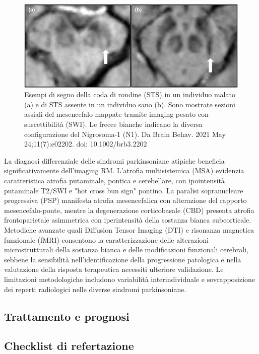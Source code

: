 \begin{figure}[h]
	\centering
	\includegraphics[width=0.8\linewidth]{FileAusiliari/Immagini/degenerative/BRB3-11-e02202-g002}
	\caption{Esempi di segno della coda di rondine (STS) in un individuo malato (a) e di STS assente in un individuo sano (b). Sono mostrate sezioni assiali del mesencefalo mappate tramite imaging pesato con suscettibilità (SWI). Le frecce bianche indicano la diversa configurazione del Nigrosoma-1 (N1). Da Brain Behav. 2021 May 24;11(7):e02202. doi: 10.1002/brb3.2202}
	\label{fig:brb3-11-e02202-g002}
\end{figure}


La diagnosi differenziale delle sindromi parkinsoniane atipiche beneficia significativamente dell'imaging RM. L'atrofia multisistemica (MSA) evidenzia caratteristica atrofia putaminale, pontica e cerebellare, con ipointensità putaminale T2/SWI e "hot cross bun sign" pontino. La paralisi sopranucleare progressiva (PSP) manifesta atrofia mesencefalica con alterazione del rapporto mesencefalo-ponte, mentre la degenerazione corticobasale (CBD) presenta atrofia frontoparietale asimmetrica con iperintensità della sostanza bianca subcorticale.
Metodiche avanzate quali Diffusion Tensor Imaging (DTI) e risonanza magnetica funzionale (fMRI) consentono la caratterizzazione delle alterazioni microstrutturali della sostanza bianca e delle modificazioni funzionali cerebrali, sebbene la sensibilità nell'identificazione della progressione patologica e nella valutazione della risposta terapeutica necessiti ulteriore validazione. Le limitazioni metodologiche includono variabilità interindividuale e sovrapposizione dei reperti radiologici nelle diverse sindromi parkinsoniane.

\subsection{Trattamento e prognosi}

\subsection{Checklist di refertazione}

